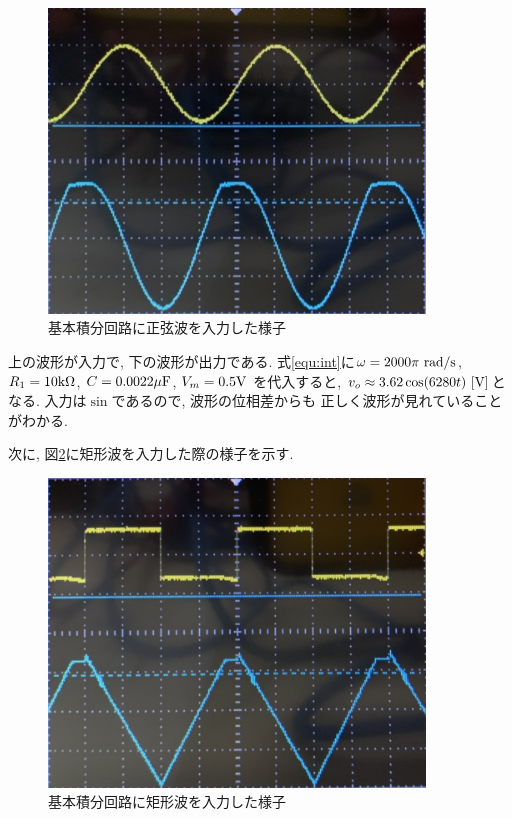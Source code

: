 \documentclass[titlepage]{jsarticle}
\begin{document}
            \begin{figure}[h]
                \centering
                \includegraphics[width=10cm]{img/int-graph1.jpg}
                \caption{基本積分回路に正弦波を入力した様子}
                \label{fig:int1}
            \end{figure}

            上の波形が入力で, 下の波形が出力である.
            式\ref{equ:int}に$\omega = 2000\pi \ \rm{rad/s}$,
            $R_1 = 10 \rm{k\Omega}$, $C = 0.0022 \rm{\mu F}$,
            $V_m = 0.5 \rm{V}$
            を代入すると, $v_o \approx 3.62 \cos(6280t) \ \rm{[V]}$となる.
            入力は$\sin$であるので, 波形の位相差からも
            正しく波形が見れていることがわかる.

            次に, 図\ref{fig:int2}に矩形波を入力した際の様子を示す.

            \begin{figure}[h]
                \centering
                \includegraphics[width=10cm]{img/int-graph2.jpg}
                \caption{基本積分回路に矩形波を入力した様子}
                \label{fig:int2}
            \end{figure}
\end{document}
